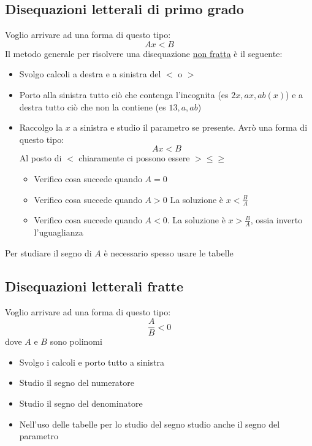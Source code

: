 \subsection{Disequazioni letterali di primo grado}
Voglio arrivare ad una forma di questo tipo:
\[
	Ax < B
\]
Il metodo generale per risolvere una disequazione \underline{non fratta} è il seguente:
\begin{itemize}
	\item Svolgo calcoli a destra e a sinistra del $ < $ o $ > $
	\item Porto alla sinistra tutto ciò che contenga l'incognita (es $ 2x, ax, ab\left(x\right) $) e a destra tutto ciò che non la contiene (es $ 13, a, ab $)
	\item Raccolgo la $ x $ a sinistra e studio il parametro se presente. Avrò una forma di questo tipo:
	      \[
		      Ax < B
	      \]
	      Al posto di $ < $ chiaramente ci possono essere $ > \le \ge  $
	      \begin{itemize}
		      \item Verifico cosa succede quando $ A = 0 $
		      \item Verifico cosa succede quando $ A>0 $ La soluzione è $ x < \frac{B}{A}  $
		      \item Verifico cosa succede quando $ A<0 $. La soluzione è $ x > \frac{B}{A}  $, ossia inverto l'uguaglianza
	      \end{itemize}
\end{itemize}
Per studiare il segno di $ A $ è necessario spesso usare le tabelle
\subsection{Disequazioni letterali fratte}
Voglio arrivare ad una forma di questo tipo:
\[
	\frac{A}{B} < 0
\]
dove $ A $ e $ B $ sono polinomi
\begin{itemize}
	\item Svolgo i calcoli e porto tutto a sinistra
	\item Studio il segno del numeratore
	\item Studio il segno del denominatore
	\item Nell'uso delle tabelle per lo studio del segno studio anche il segno del parametro
\end{itemize}

